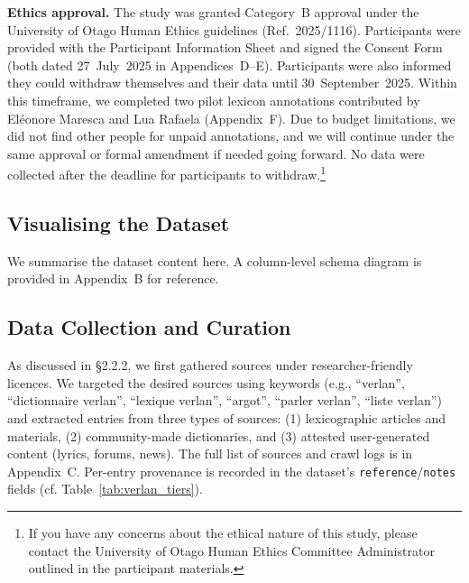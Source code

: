 \documentclass[12pt]{article}
\begin{document}
\noindent \textbf{Ethics approval.} The study was granted Category~B approval under the University of Otago Human Ethics guidelines (Ref.\ 2025/1116). Participants were provided with the Participant Information Sheet and signed the Consent Form (both dated 27~July~2025 in Appendices~D--E). Participants were also informed they could withdraw themselves and their data until 30~September~2025. Within this timeframe, we completed two pilot lexicon annotations contributed by Eléonore Maresca and Lua Rafaela (Appendix~F). Due to budget limitations, we did not find other people for unpaid annotations, and we will continue under the same approval or formal amendment if needed going forward. No data were collected after the deadline for participants to withdraw.\footnote{If you have any concerns about the ethical nature of this study, please contact the University of Otago Human Ethics Committee Administrator outlined in the participant materials.}

\subsection{Visualising the Dataset}

We summarise the dataset content here. A column-level schema diagram is provided in Appendix~B for reference.

\begin{table}[H]
\centering
\caption{Dataset at a glance (snapshot as of September 2025).}
\label{tab:dataset-glance}
\end{table}


\subsection{Data Collection and Curation}
As discussed in §2.2.2, we first gathered sources under researcher-friendly licences. We targeted the desired sources using keywords (e.g., ``verlan'', ``dictionnaire verlan'', ``lexique verlan'', ``argot'', ``parler verlan'', ``liste verlan'') and extracted entries from three types of sources: (1) lexicographic articles and materials, (2) community-made dictionaries, and (3) attested user-generated content (lyrics, forums, news). The full list of sources and crawl logs is in Appendix~C. Per-entry provenance is recorded in the dataset's \texttt{reference}/\texttt{notes} fields (cf. Table~\ref{tab:verlan_tiers}).
\end{document}
